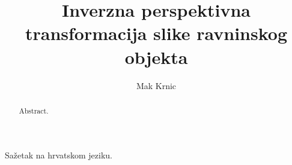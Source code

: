 \documentclass[times, utf8, zavrsni, numeric]{fer}
\begin{document}

\title{Inverzna perspektivna transformacija slike ravninskog objekta}

\author{Mak Krnic}

\maketitle

\izvornik

\zahvala{}

\tableofcontents









%



\begin{sazetak}
Sažetak na hrvatskom jeziku.

\end{sazetak}

\begin{abstract}
Abstract.

\end{abstract}
\end{document}
